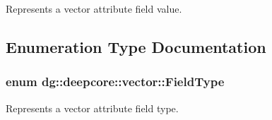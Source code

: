 Represents a vector attribute field value. 



\subsection{Enumeration Type Documentation}
\subsubsection[{\texorpdfstring{Field\+Type}{FieldType}}]{\setlength{\rightskip}{0pt plus 5cm}enum {\bf dg\+::deepcore\+::vector\+::\+Field\+Type}\hspace{0.3cm}{\ttfamily [strong]}}\hypertarget{group___vector_module_gaedcee2e418daac47dd4516efa9a0b99d}{}\label{group___vector_module_gaedcee2e418daac47dd4516efa9a0b99d}


Represents a vector attribute field type. 

